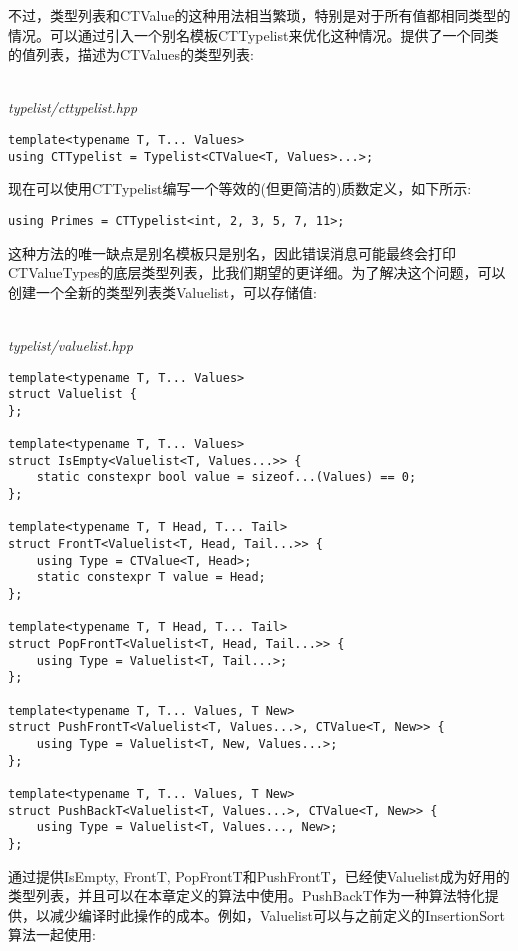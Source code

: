 不过，类型列表和CTValue的这种用法相当繁琐，特别是对于所有值都相同类型的情况。可以通过引入一个别名模板CTTypelist来优化这种情况。提供了一个同类的值列表，描述为CTValues的类型列表:

\hspace*{\fill} \\ %
\noindent
\textit{typelist/cttypelist.hpp}
\begin{lstlisting}[style=styleCXX]
template<typename T, T... Values>
using CTTypelist = Typelist<CTValue<T, Values>...>;
\end{lstlisting}

现在可以使用CTTypelist编写一个等效的(但更简洁的)质数定义，如下所示:

\begin{lstlisting}[style=styleCXX]
using Primes = CTTypelist<int, 2, 3, 5, 7, 11>;
\end{lstlisting}

这种方法的唯一缺点是别名模板只是别名，因此错误消息可能最终会打印CTValueTypes的底层类型列表，比我们期望的更详细。为了解决这个问题，可以创建一个全新的类型列表类Valuelist，可以存储值:

\hspace*{\fill} \\ %
\noindent
\textit{typelist/valuelist.hpp}
\begin{lstlisting}[style=styleCXX]
template<typename T, T... Values>
struct Valuelist {
};

template<typename T, T... Values>
struct IsEmpty<Valuelist<T, Values...>> {
	static constexpr bool value = sizeof...(Values) == 0;
};

template<typename T, T Head, T... Tail>
struct FrontT<Valuelist<T, Head, Tail...>> {
	using Type = CTValue<T, Head>;
	static constexpr T value = Head;
};

template<typename T, T Head, T... Tail>
struct PopFrontT<Valuelist<T, Head, Tail...>> {
	using Type = Valuelist<T, Tail...>;
};

template<typename T, T... Values, T New>
struct PushFrontT<Valuelist<T, Values...>, CTValue<T, New>> {
	using Type = Valuelist<T, New, Values...>;
};

template<typename T, T... Values, T New>
struct PushBackT<Valuelist<T, Values...>, CTValue<T, New>> {
	using Type = Valuelist<T, Values..., New>;
};
\end{lstlisting}

通过提供IsEmpty, FrontT, PopFrontT和PushFrontT，已经使Valuelist成为好用的类型列表，并且可以在本章定义的算法中使用。PushBackT作为一种算法特化提供，以减少编译时此操作的成本。例如，Valuelist可以与之前定义的InsertionSort算法一起使用:

